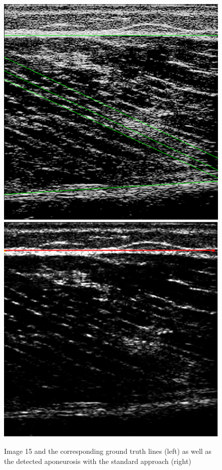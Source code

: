 \documentclass[10pt,twocolumn,letterpaper]{article}
\begin{document}
\begin{figure}
	\begin{center}		
		\includegraphics[width=0.47\linewidth]{img/im15_gt}
		\includegraphics[width=0.47\linewidth]{img/im15_hough_apo}
	\end{center}
	\caption{Image 15 and the corresponding ground truth lines (left) as well as the detected aponeurosis with the standard approach (right)}
	\label{fig:im15_gt}
	
\end{figure}
\end{document}
